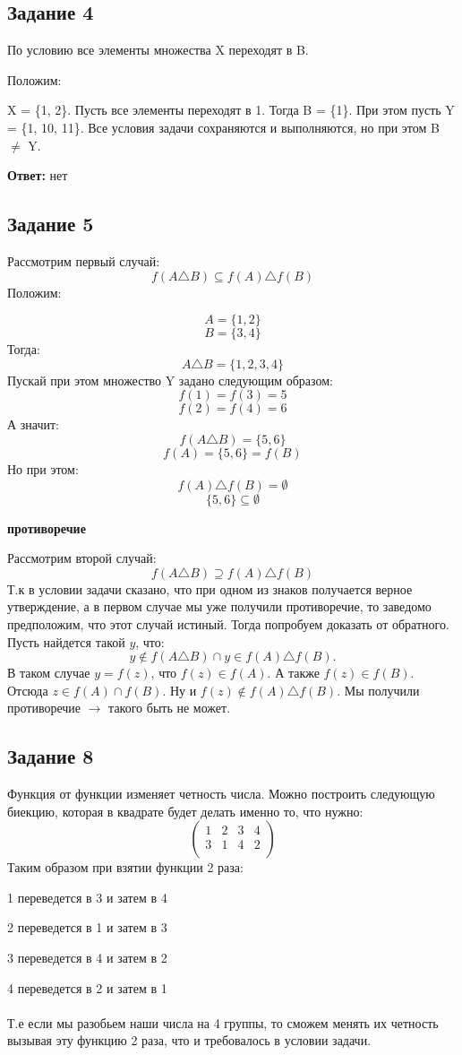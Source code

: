 \documentclass[a4paper,12pt]{article}
\begin{document}
\subsection*{Задание 4}
По условию все элементы множества X переходят в B.

Положим:

X = \{1, 2\}.  Пусть все элементы переходят в 1. Тогда  B = \{1\}. При этом пусть Y = \{1, 10, 11\}. Все условия задачи сохраняются и выполняются, но при этом B $\neq$ Y.
\begin{center}
\textbf{Ответ:} нет
\end{center}
\subsection*{Задание 5}
Рассмотрим первый случай:
\[
f(A \triangle B) \subseteq f(A) \triangle f(B) 
\]
Положим:

\[
A = \{ 1, 2\}
\]
\[
B = \{ 3, 4\}
\]
Тогда:
\[
A \triangle B = \{1, 2, 3, 4\}
\]
Пускай при этом множество Y задано следующим образом:
\[
f(1) = f(3) = 5
\]
\[
f(2) = f(4) = 6
\]
А значит:
\[
f(A \triangle B) = \{5, 6\}
\]
\[
f(A) = \{5, 6\} = f(B)
\]
Но при этом:
\[
f(A) \triangle f(B) = \emptyset 
\]
\[
\{5, 6\} \subseteq \emptyset
\]
\begin{center}
\textbf{противоречие}
\end{center}

Рассмотрим второй случай:
\[
f(A \triangle B) \supseteq f(A) \triangle f(B) 
\] Т.к в условии задачи сказано, что при одном из знаков получается верное утверждение, а в первом случае мы уже получили противоречие, то заведомо предположим, что этот случай истиный. Тогда попробуем доказать от обратного. Пусть найдется такой $y$, что:
\[
y \notin f(A \triangle B) \cap y \in f(A) \triangle f(B).
\]
В таком случае $y = f(z)$, что  $f(z) \in f(A)$. А также $f(z) \in f(B)$. Отсюда $z \in f(A) \cap f(B)$.  Ну и $f(z) \notin f(A) \triangle f(B)$. Мы получили противоречие $\rightarrow$ такого быть не может.
\subsection*{Задание 8}
Функция от функции изменяет четность числа. Можно построить следующую биекцию, которая в квадрате будет делать именно то, что нужно:
\[
\begin{pmatrix}
1 & 2 & 3 & 4 \\
3 & 1 & 4  &2 \\
\end{pmatrix}
\]
Таким образом при взятии функции 2 раза:

1 переведется в 3 и затем в 4

2 переведется в 1 и затем в 3

3 переведется в 4 и затем в 2

4 переведется в 2 и затем в 1
\\\\
Т.е если мы разобьем наши числа на 4 группы, то сможем менять их четность  вызывая эту функцию 2 раза,
что и требовалось в условии задачи.
\end{document}
